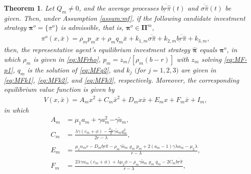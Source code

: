 \documentclass[10pt,a4paper]{amsart}
\newtheorem{theorem}{Theorem}
\newcommand{\bpi}{\boldsymbol{\pi}}
\begin{document}
\begin{theorem}
Let \(Q_{\scriptscriptstyle m}\neq 0\), and the average processes \(\overline{\underline{br}\widehat{\pi}}(t)\) and  \(\overline{\sigma\widehat{\pi}}(t)\) be given. Then, under Assumption \ref{assum:mf}, if the following candidate investment strategy ${\bpi^o} = \{{\pi^o}\}$ is admissible, that is, ${\bpi^o} \in \boldsymbol{\Pi}^m$,
\begin{align}\label{eq:M-pi_i}
{\pi^o}(x, \bar{x}) = \rho_{\scriptscriptstyle m} p_{\scriptscriptstyle m} x + \rho_{\scriptscriptstyle m} q_{\scriptscriptstyle m} \bar{x} + k_{1,m} \overline{\sigma\widehat{\pi}} + k_{2,m}\overline{\underline{br}\widehat{\pi}}+k_{3,m},
\end{align}
then, the representative agent's equilibrium investment strategy \(\widehat{\bpi}\) equals ${\bpi^o}$,
in which \(\rho_{\scriptscriptstyle m}\) is given in \eqref{eq:MFrho},  \(p_{\scriptscriptstyle m}=z_{\scriptscriptstyle m}/[\rho_{\scriptscriptstyle m}(b-r)]\) with \(z_{\scriptscriptstyle m}\) solving  \eqref{eq:MF-p1}, \(q_{\scriptscriptstyle m}\) is the solution of \eqref{eq:MFq2}, and
			\(k_j\) $($for \(j=1,2,3\)$)$ are given in \eqref{eq:MFk1}, \eqref{eq:MFk2}, and \eqref{eq:MFk3}, respectively.
			Moreover, the corresponding equilibrium value function is given by
			\begin{align}\label{eq:MF-VV}
				V(x,\bar{x})=A_{\scriptscriptstyle m} x^2+C_{\scriptscriptstyle m} \bar{x}^2+D_{\scriptscriptstyle m} x\bar{x}+E_{\scriptscriptstyle m} x+F_{\scriptscriptstyle m} \bar{x}+I_{\scriptscriptstyle m},
			\end{align}
			in which
			\begin{align}
				A_{\scriptscriptstyle m}&=\mu_1 a_{\scriptscriptstyle m}+\gamma {a^2_{\scriptscriptstyle m}}{-\gamma  \tilde{a}_{\scriptscriptstyle m},}\\
				C_{\scriptscriptstyle m}&=\frac{\lambda\gamma(c_{\scriptscriptstyle m}+\phi)-\frac{\rho_{\scriptscriptstyle m}}{2}\gamma \tilde{a}_{\scriptscriptstyle m}{q^2_{\scriptscriptstyle m}}}{2r-\lambda},\\
				E_{\scriptscriptstyle m}&=\frac{\mu_1\alpha_{\scriptscriptstyle m}r-D_{\scriptscriptstyle m}\overline{\underline{br}\widehat{\pi}}-\rho_{\scriptscriptstyle m}\gamma  \tilde{a}_{\scriptscriptstyle m}\varrho_{\scriptscriptstyle m}p_{\scriptscriptstyle m}+2(a_{\scriptscriptstyle m}-1)\gamma\lambda \alpha_{\scriptscriptstyle m}-\mu_2\lambda}{r-\lambda},\\
				F_{\scriptscriptstyle m}&=\frac{2\lambda\gamma \alpha_{\scriptscriptstyle m}(c_{\scriptscriptstyle m}+\phi)+\lambda\mu_2\phi-\rho_{\scriptscriptstyle m}\gamma \tilde{a}_{\scriptscriptstyle m}\varrho_{\scriptscriptstyle m}q_{\scriptscriptstyle m}-2C_{\scriptscriptstyle m}\overline{\underline{br}\widehat{\pi}}}{r-\lambda},\\

\end{align}
\end{theorem}
\end{document}
